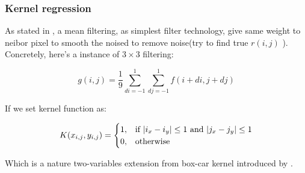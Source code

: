 \documentclass{beamer}
\begin{document}
\begin{frame}

    \frametitle{Kernel regression}

    As stated in \cite{solomon2011fundamentals}, a mean filtering, as simplest filter technology, give same weight to neibor pixel to smooth the
    noised to remove noise(try to find true $r(i,j)$ ). Concretely, here's a instance of $3 \times 3$ filtering:
    
    \begin{equation}
    g(i,j) = \frac{1}{9} \sum_{di=-1}^1 \sum_{dj=-1}^1 f(i+di,j+dj)
    \label{eq:mean_filter}
    \end{equation}
    
    If we set kernel function as:
    
    $$ 
    K(x_{i,j},y_{i,j}) =  
    \begin{cases}
      1, & \text{if $ |i_x - i_y| \le 1$ and $|j_x - j_y| \le 1$} \\
      0, & \text{otherwise}
    \end{cases}
    $$
    
    Which is a nature two-variables extension from box-car kernel introduced by \cite{wasserman2006all}.

    
\end{frame}
\end{document}
